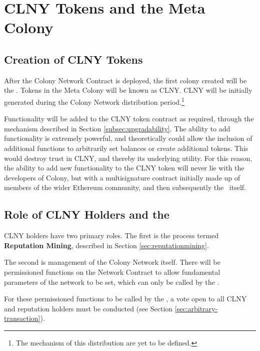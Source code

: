 \section{CLNY Tokens and the Meta Colony}\label{sec:clny}

\subsection{Creation of CLNY Tokens}
After the Colony Network Contract is deployed, the first colony created will be the \rc. Tokens in the Meta Colony will be known as CLNY. CLNY will be initially generated during the Colony Network distribution period.\footnote{The mechanism of this distribution are yet to be defined.} %
 
Functionality will be added to the CLNY token contract as required, through the  mechanism described in Section  \ref{subsec:upgradability}. The ability to add functionality is extremely powerful, and theoretically could allow the inclusion of additional functions to arbitrarily set balances or create additional tokens. This would destroy trust in CLNY, and thereby its underlying utility. For this reason, the ability to add new functionality to the CLNY token will never lie with the developers of Colony, but with a multisignature contract initially made up of members of the wider Ethereum community, and then subsequently the \rc\ itself.

\subsection{Role of CLNY Holders and the \rc}
CLNY holders have two primary roles. The first is the process termed \textbf{Reputation Mining}, described in Section \ref{sec:reputationmining}.

The second is management of the Colony Network itself. There will be permissioned functions on the Network Contract to allow fundamental parameters of the network to be set, which can only be called by the \rc.

For these permissioned functions to be called by the \rc, a vote open to all CLNY and reputation holders must be conducted  (see Section \ref{sec:arbitrary-transaction}).


